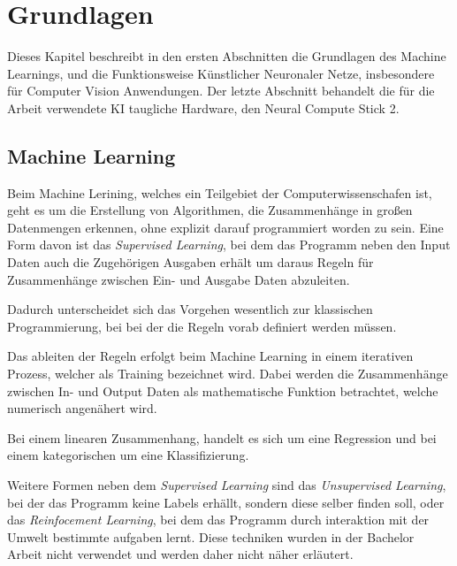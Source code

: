 \chapter{Grundlagen}\label{kap:grundlagen}


Dieses Kapitel beschreibt in den ersten Abschnitten die Grundlagen 
des Machine Learnings, und die Funktionsweise Künstlicher Neuronaler Netze,
insbesondere für Computer Vision Anwendungen.
Der letzte Abschnitt behandelt die für die Arbeit verwendete KI taugliche 
Hardware, den Neural Compute Stick 2.




\section{Machine Learning}\label{sec:ml}

Beim Machine Lerining, welches ein Teilgebiet der Computerwissenschafen
ist, geht es um die Erstellung von Algorithmen, die Zusammenhänge in großen
Datenmengen erkennen, ohne explizit darauf programmiert worden zu sein.
Eine Form davon ist das \textit{Supervised Learning}, bei dem das Programm 
neben den Input Daten auch die Zugehörigen Ausgaben erhält um daraus 
Regeln für Zusammenhänge zwischen Ein- und Ausgabe Daten abzuleiten.

Dadurch unterscheidet sich das Vorgehen wesentlich zur klassischen Programmierung,
bei bei der die Regeln vorab definiert werden müssen.

\vspace{0.4cm}
\begin{center}
        
\end{center}
\vspace{0.4cm}



Das ableiten der Regeln erfolgt beim Machine Learning in einem 
iterativen Prozess, welcher als Training bezeichnet wird.
Dabei werden die Zusammenhänge zwischen In- und Output Daten 
als mathematische Funktion betrachtet, welche numerisch 
angenähert wird.

Bei einem linearen Zusammenhang, handelt es sich
um eine Regression und bei einem kategorischen um 
eine Klassifizierung.

Weitere Formen neben dem \textit{Supervised Learning} sind das 
\textit{Unsupervised Learning}, bei der das Programm keine Labels 
erhällt, sondern diese selber finden 
soll, oder das \textit{Reinfocement Learning}, bei dem das Programm 
durch interaktion mit der Umwelt bestimmte aufgaben lernt.
Diese techniken wurden in der Bachelor Arbeit nicht verwendet 
und werden daher nicht näher erläutert.

